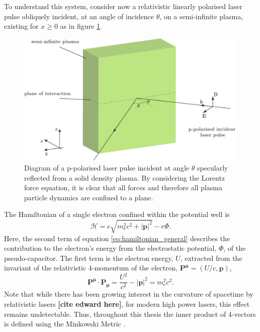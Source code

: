 To understand this system, consider now a relativistic linearly polarised laser pulse obliquely incident, at an angle of incidence $\theta$, on a semi-infinite plasma, existing for $x\ge0$ as in figure \ref{fig:zvpforcesppol}.
\begin{figure}
	\centering
	\includegraphics[width=0.7\linewidth]{figures/zvp/zvp_forces_ppol}
	\caption[Diagram of a p-polarised laser pulse incident at angle $\theta$ specularly reflected from a solid density plasma.]{Diagram of a p-polarised laser pulse incident at angle $\theta$ specularly reflected from a solid density plasma. By considering the Lorentz force equation, it is clear that all forces and therefore all plasma particle dynamics are confined to a plane.}
	\label{fig:zvpforcesppol}
\end{figure}
The Hamiltonian of a single electron confined within the potential well \cite{goldsteinClassicalMechanics2013} is
\begin{equation}\label{eq:hamiltonian_general}
	\mathcal{H} = c\sqrt{m^2_\mathrm{e}c^2 + |\mathbf{p}|^2} - e\Phi.
\end{equation}
Here, the second term of equation \ref{eq:hamiltonian_general} describes the contribution to the electron's energy from the electrostatic potential, $\Phi$, of the pseudo-capacitor. The first term is the electron energy, $U$, extracted from the invariant of the relativistic 4-momentum of the electron, $\mathbf{P^\mu} = (U/c, \mathbf{p})$,
\begin{equation}
	\mathbf{P^\mu \cdot P_\mu} = \frac{U^2}{c^2} - |\mathbf{p}|^2 = m^2_\mathrm{e}c^2.
\end{equation}
Note that while there has been growing interest in the curvature of spacetime by relativistic lasers \textbf{[cite edward here]}, for modern high power lasers, this effect remains undetectable. Thus, throughout this thesis the inner product of 4-vectors is defined using the Minkowski Metric \cite{steaneRelativityMadeRelatively2012}.


